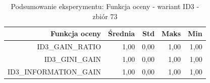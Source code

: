 \begin{table}[htbp]
\centering
\small
\setlength{\tabcolsep}{6pt}
\renewcommand{\arraystretch}{1.2}
\caption{Podsumowanie eksperymentu: Funkcja oceny - wariant ID3 - zbiór 73}
\label{tab:ID3_eval_function_73}
\begin{tabular}{r|r|r|r|r}
\toprule
Funkcja oceny & Średnia & Std & Maks & Min \\
\hline
ID3\_GAIN\_RATIO & 1,00 & 0,00 & 1,00 & 1,00 \\
ID3\_GINI\_GAIN & 1,00 & 0,00 & 1,00 & 1,00 \\
ID3\_INFORMATION\_GAIN & 1,00 & 0,00 & 1,00 & 1,00 \\
\bottomrule
\end{tabular}
\end{table}
